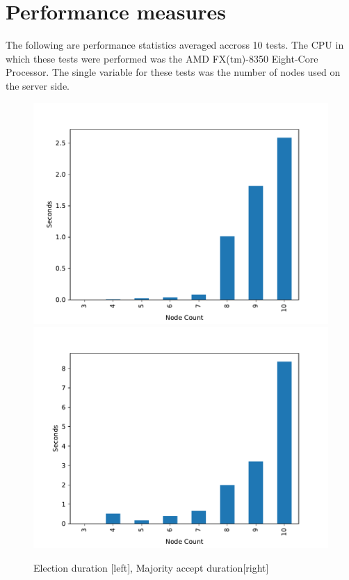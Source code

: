 \documentclass[11pt]{article}
\begin{document}
\section{Performance measures}
The following are performance statistics averaged accross 10 tests. The CPU in
which these tests were performed was the AMD FX(tm)-8350 Eight-Core Processor.
The single variable for these tests was the number of nodes used on the server
side.
\begin{figure}[H]
  \centering
  \includegraphics[scale=0.5]{image/election-stat.pdf}
  \includegraphics[scale=0.5]{image/accept-stat.pdf}
  \caption{Election duration [left], Majority accept duration[right]}
\end{figure}
\end{document}
